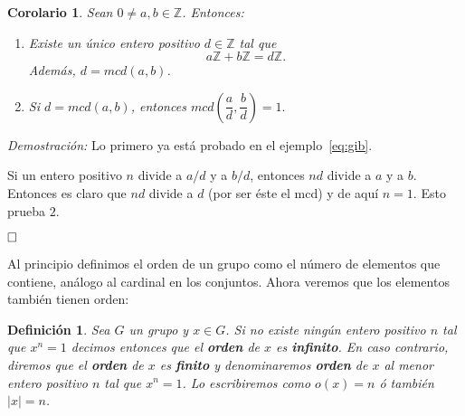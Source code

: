 \documentclass[12pt]{article}
\newtheorem{definition}[theorem]{Definición}
\newtheorem{corolario}{Corolario}[theorem]
\begin{document}
\begin{corolario}Sean $0\neq a,b \in \mathbb{Z}$. Entonces:
\begin{enumerate}
\item Existe un único entero positivo $d \in \mathbb{Z}$ tal que $$a\mathbb{Z}+b\mathbb{Z} = d\mathbb{Z}.$$ Además, $d = mcd(a,b)$.
\item Si $d = mcd(a,b)$, entonces $mcd \left(\dfrac{a}{d}, \dfrac{b}{d} \right) = 1.$
\end{enumerate}
\end{corolario}
\emph{Demostración: }Lo primero ya está probado en el ejemplo~\ref{eq:gib}.

Si un entero positivo $n$ divide a $a/d$ y a $b/d$, entonces $nd$ divide a $a$ y a $b$. Entonces es claro que $nd$ divide a $d$ (por ser éste el mcd) y de aquí $n=1$. Esto prueba $2.$

$\hfill \square$

Al principio definimos el orden de un grupo como el número de elementos que contiene, análogo al cardinal en los conjuntos. Ahora veremos que los elementos también tienen orden:

\begin{definition}Sea $G$ un grupo y $x \in G$. Si no existe ningún entero positivo $n$ tal que $x^n=1$ decimos entonces que el \textbf{orden} de $x$ es \textbf{infinito}. En caso contrario, diremos que el \textbf{orden} de $x$ es \textbf{finito} y denominaremos \textbf{orden} de $x$ al menor entero positivo $n$ tal que $x^n =1$. Lo escribiremos como $o(x) = n$ ó también $|x| = n$.
\end{definition}
\end{document}
